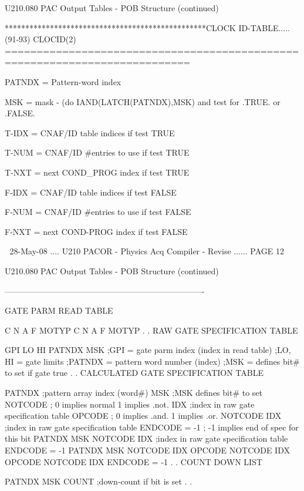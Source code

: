  
 
   U210.080  PAC Output Tables - POB Structure (continued)
 
 
   *************************************************CLOCK ID-TABLE.....(91-93)
   CLOCID(2)
   ===========================================================================
 
 
   PATNDX = Pattern-word index
 
   MSK    = mask - (do IAND(LATCH(PATNDX),MSK) and test for .TRUE. or .FALSE.
 
   T-IDX  = CNAF/ID table indices     if test TRUE
 
   T-NUM  = CNAF/ID #entries to use   if test TRUE
 
   T-NXT  = next COND_PROG index      if test TRUE
 
   F-IDX  = CNAF/ID table indices     if test FALSE
 
   F-NUM  = CNAF/ID #entries to use   if test FALSE
 
   F-NXT  = next COND-PROG index      if test FALSE
 
    
   28-May-08 .... U210  PACOR -  Physics Acq Compiler - Revise ...... PAGE  12
 
 
   U210.080  PAC Output Tables - POB Structure (continued)
 
   -------------------------------------------------------------------------
 
   GATE PARM READ TABLE
 
   C  N  A  F  MOTYP
   C  N  A  F  MOTYP
   .
   .
   RAW GATE SPECIFICATION TABLE
 
   GPI LO HI PATNDX MSK  ;GPI    = gate parm index (index in read table)
                         ;LO, HI = gate limits
                         ;PATNDX = pattern word number (index)
                         ;MSK    = defines bit# to set if gate true
   .
   .
   CALCULATED GATE SPECIFICATION TABLE
 
   PATNDX                ;pattern array index (word#)
   MSK                   ;MSK defines bit# to set
   NOTCODE               ; 0  implies normal  1  implies .not.
   IDX                   ;index in raw gate specification table
   OPCODE                ; 0  implies .and.  1  implies .or.
   NOTCODE
   IDX                   ;index in raw gate specification table
   ENDCODE = -1          ; -1  implies end of spec for this bit
   PATNDX
   MSK
   NOTCODE
   IDX                   ;index in raw gate specification table
   ENDCODE = -1
   PATNDX
   MSK
   NOTCODE
   IDX
   OPCODE
   NOTCODE
   IDX
   OPCODE
   NOTCODE
   IDX
   ENDCODE = -1
   .
   .
   COUNT DOWN LIST
 
   PATNDX  MSK  COUNT    ;down-count if bit is set
   .
   .
